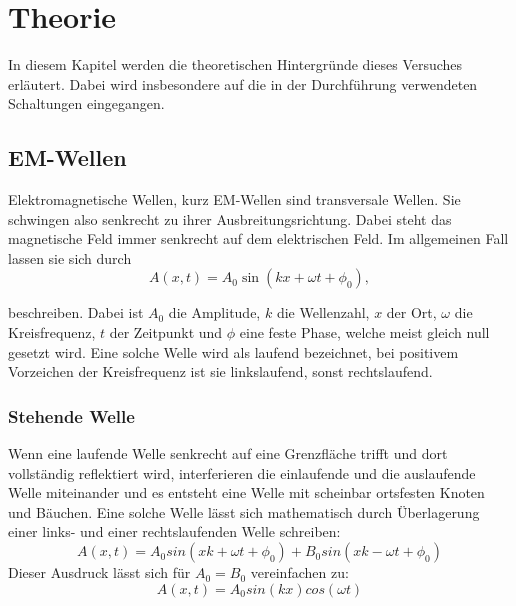 \section{Theorie} 
\label{sec:Theorie}

In diesem Kapitel werden die theoretischen Hintergründe dieses Versuches erläutert. Dabei wird insbesondere auf die in der Durchführung verwendeten Schaltungen eingegangen.


\subsection{EM-Wellen}
\label{sec:themwellen}
Elektromagnetische Wellen, kurz EM-Wellen sind transversale Wellen. Sie schwingen also senkrecht zu ihrer
Ausbreitungsrichtung. Dabei steht das magnetische Feld immer senkrecht auf dem elektrischen Feld.
Im allgemeinen Fall lassen sie sich durch  
\begin{equation}
    \label{eq:wellenfunktion}
    A(x,t)=A_0\sin(kx+\omega t+\phi_0),
\end{equation}

beschreiben. Dabei ist $A_0$ die Amplitude, $k$ die Wellenzahl, $x$ der Ort, $\omega$ die Kreisfrequenz, $t$ der Zeitpunkt
und $\phi$ eine feste Phase, welche meist gleich null gesetzt wird. Eine solche Welle wird als laufend bezeichnet, bei positivem Vorzeichen der Kreisfrequenz
ist sie linkslaufend, sonst rechtslaufend.


\subsubsection{Stehende Welle}
\label{sec:thstehendewelle}
Wenn eine laufende Welle senkrecht auf eine Grenzfläche trifft und dort vollständig reflektiert wird,
interferieren die einlaufende und die auslaufende Welle miteinander und es entsteht eine Welle
mit scheinbar ortsfesten Knoten und Bäuchen. Eine solche Welle lässt sich mathematisch durch Überlagerung
einer links- und einer rechtslaufenden Welle schreiben:
\begin{equation}
    \label{eq:stehendewelle}
    A(x,t)=A_0sin(xk+\omega t +\phi_0)+B_0sin(xk-\omega t +\phi_0)
\end{equation}
Dieser Ausdruck lässt sich für $A_0=B_0$ vereinfachen zu:
\begin{equation}
    A(x,t)=A_0sin(kx)cos(\omega t)
\end{equation}

